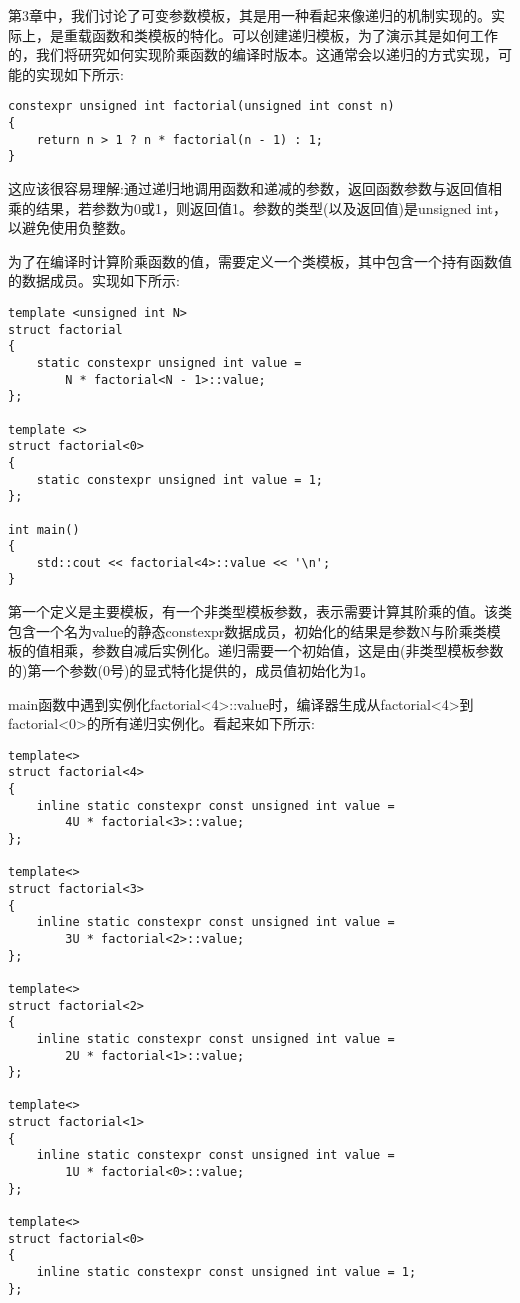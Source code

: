 第3章中，我们讨论了可变参数模板，其是用一种看起来像递归的机制实现的。实际上，是重载函数和类模板的特化。可以创建递归模板，为了演示其是如何工作的，我们将研究如何实现阶乘函数的编译时版本。这通常会以递归的方式实现，可能的实现如下所示:

\begin{lstlisting}[style=styleCXX]
constexpr unsigned int factorial(unsigned int const n)
{
	return n > 1 ? n * factorial(n - 1) : 1;
}
\end{lstlisting}

这应该很容易理解:通过递归地调用函数和递减的参数，返回函数参数与返回值相乘的结果，若参数为0或1，则返回值1。参数的类型(以及返回值)是unsigned int，以避免使用负整数。

为了在编译时计算阶乘函数的值，需要定义一个类模板，其中包含一个持有函数值的数据成员。实现如下所示:

\begin{lstlisting}[style=styleCXX]
template <unsigned int N>
struct factorial
{
	static constexpr unsigned int value =
		N * factorial<N - 1>::value;
};

template <>
struct factorial<0>
{
	static constexpr unsigned int value = 1;
};

int main()
{
	std::cout << factorial<4>::value << '\n';
}
\end{lstlisting}

第一个定义是主要模板，有一个非类型模板参数，表示需要计算其阶乘的值。该类包含一个名为value的静态constexpr数据成员，初始化的结果是参数N与阶乘类模板的值相乘，参数自减后实例化。递归需要一个初始值，这是由(非类型模板参数的)第一个参数(0号)的显式特化提供的，成员值初始化为1。

main函数中遇到实例化factorial<4>::value时，编译器生成从factorial<4>到factorial<0>的所有递归实例化。看起来如下所示:

\begin{lstlisting}[style=styleCXX]
template<>
struct factorial<4>
{
	inline static constexpr const unsigned int value =
		4U * factorial<3>::value;
};

template<>
struct factorial<3>
{
	inline static constexpr const unsigned int value =
		3U * factorial<2>::value;
};

template<>
struct factorial<2>
{
	inline static constexpr const unsigned int value =
		2U * factorial<1>::value;
};

template<>
struct factorial<1>
{
	inline static constexpr const unsigned int value =
		1U * factorial<0>::value;
};

template<>
struct factorial<0>
{
	inline static constexpr const unsigned int value = 1;
};
\end{lstlisting}

